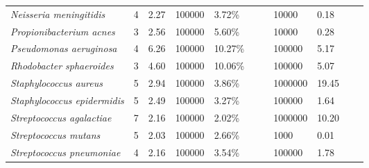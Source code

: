 \documentclass{article}
\begin{document}
\begin{landscape}
\begin{table}
\begin{tabular}{lllllllllll}
\textit{Neisseria meningitidis} & 4 & 2.27  & 100000 & 3.72\% & && 10000 & 0.18\\
\textit{Propionibacterium acnes} & 3 & 2.56  & 100000 & 5.60\% & && 10000 & 0.28\\
\textit{Pseudomonas aeruginosa} & 4 & 6.26  & 100000 & 10.27\% & && 100000 & 5.17\\
\textit{Rhodobacter sphaeroides} & 3 & 4.60  & 100000 & 10.06\% & && 100000 & 5.07\\
\textit{Staphylococcus aureus} & 5 & 2.94  & 100000 & 3.86\% & && 1000000 & 19.45\\
\textit{Staphylococcus epidermidis} & 5 & 2.49  & 100000 & 3.27\% & && 100000 & 1.64\\
\textit{Streptococcus agalactiae} & 7 & 2.16  & 100000 & 2.02\% & && 1000000 & 10.20\\
\textit{Streptococcus mutans} & 5 & 2.03  & 100000 & 2.66\% & && 1000 & 0.01\\
\textit{Streptococcus pneumoniae} & 4 & 2.16  & 100000 & 3.54\% & && 100000 & 1.78\\
\hline
\end{tabular}
\end{table}
\end{landscape}
\end{document}
